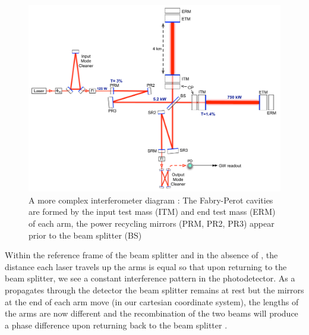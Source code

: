 \begin{figure}
   \includegraphics[width=\textwidth]{images/gr_gw/IFOdiagram.pdf}
   \caption{\label{fig:IFO}A more complex interferometer diagram \cite{aligo}: The Fabry-Perot cavities are formed by the input test mass (ITM) and end test mass (ERM) of each arm, the power recycling mirrors (PRM, PR2, PR3) appear prior to the beam splitter (BS)}
\end{figure}

Within the reference frame of the beam splitter and in the absence of \gws, the distance each laser travels up the arms is equal so that upon returning to the beam splitter, we see a constant interference pattern in the photodetector.
As a \gw propagates through the detector the beam splitter remains at rest but the mirrors at the end of each arm move (in our cartesian coordinate system), the lengths of the arms are now different and the recombination of the two beams will produce a phase difference upon returning back to the beam splitter \cite{thorne_lecture}.
